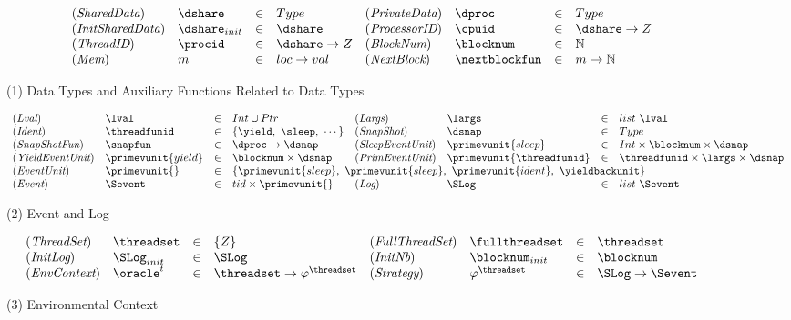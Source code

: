 \begin{figure}
\begin{small}
\[
\begin{array}{llll llll}
(\textit{SharedData}) & \dshare & \in & Type &
(\textit{PrivateData}) &  \dproc & \in & Type\\
(\textit{InitSharedData}) & \dshare_{init} & \in & \dshare &
(\textit{ProcessorID}) & \cpuid & \in & \dshare \rightarrow Z\\
(\textit{ThreadID}) & \procid & \in & \dshare \rightarrow Z&
(\textit{BlockNum}) & \blocknum & \in & \mathbb{N} \\
(\textit{Mem}) & m & \in & loc \rightarrow val &
(\textit{NextBlock}) & \nextblockfun & \in & m \rightarrow  \mathbb{N} \\
\end{array}
\]
\begin{center}
(1) Data Types and Auxiliary Functions Related to Data Types
\end{center}
\vspace{-1em}

\[
\begin{array}{llllllll}
(\textit{Lval}) & \lval & \in & Int \cup Ptr  &
(\textit{Largs}) & \largs & \in & list \ \lval  \\
(\textit{Ident}) & \threadfunid & \in & \{\yield,\ \sleep,\ \cdots\}&
(\textit{SnapShot}) & \dsnap & \in & Type  \\
(\textit{SnapShotFun}) & \snapfun & \in &  \dproc \rightarrow \dsnap &
(\textit{SleepEventUnit}) & \primevunit{sleep} & \in & Int \times \blocknum \times \dsnap \\
(\textit{YieldEventUnit}) & \primevunit{yield} & \in & \blocknum \times \dsnap &
(\textit{PrimEventUnit}) & \primevunit{\threadfunid} & \in & \threadfunid \times \largs \times \dsnap \\
(\textit{EventUnit}) &  \primevunit{} & \in &
\multicolumn{5}{l}{
 \{\primevunit{sleep},\ \primevunit{sleep},\  \primevunit{ident},\  \yieldbackunit \} 
 }
 \\
(\textit{Event}) &  \Sevent & \in & tid \times \primevunit{} &
(\textit{Log}) &  \SLog & \in & list\ \Sevent \\
\end{array}
\]
\begin{center}
(2) Event and Log
\end{center}
\vspace{-1em}

\[
\begin{array}{llll llll}
(\textit{ThreadSet}) & \threadset & \in & \{Z\} &
(\textit{FullThreadSet}) & \fullthreadset & \in & \threadset \\
(\textit{InitLog}) & \SLog_{init} & \in & \SLog &
(\textit{InitNb}) & \blocknum_{init} & \in & \blocknum \\
(\textit{EnvContext}) & \oracle^{t} & \in & \threadset \rightarrow \varphi^{\threadset} &
(\textit{Strategy}) & \varphi^{\threadset} & \in & \SLog \rightarrow \Sevent \\
\end{array}
\]
\begin{center}
(3) Environmental Context
\end{center}


\end{small}
\end{figure}

